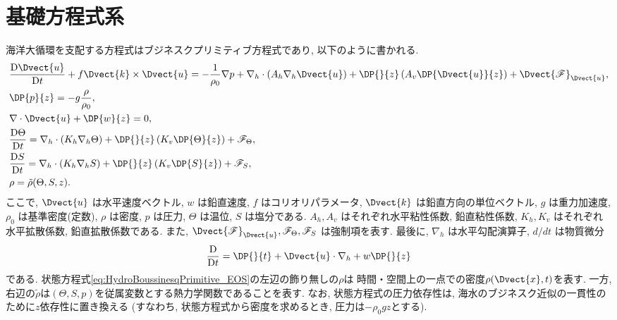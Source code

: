 \section{基礎方程式系}
海洋大循環を支配する方程式はブジネスクプリミティブ方程式であり,
以下のように書かれる.
\begin{subequations}
\begin{align}
 &   \DD{\Dvect{u}}{t}  +  f\Dvect{k} \times \Dvect{u}
 =
   -  \dfrac{1}{\rho_0} \nabla p
   + \nabla_h \cdot  (A_h \nabla_h \Dvect{u})
   + \DP{}{z} \left(A_v \DP{\Dvect{u}}{z}\right)
   + \Dvect{\mathscr{F}}_{\Dvect{u}},
 \label{eq:HydroBoussinesqPrimitive_MomUV}  
\\%
 &   \DP{p}{z}
 = - g \dfrac{\rho}{\rho_0},
 \label{eq:HydroBoussinesqPrimitive_MomW} 
\\%
 & \nabla \cdot \Dvect{u} + \DP{w}{z}                 
 = 0,
 \label{eq:HydroBoussinesqPrimitive_Continu} 
\\%
 &   \DD{\Theta}{t}
 =   \nabla_h \cdot (K_h \nabla_h \Theta)
   + \DP{}{z} \left(K_v\DP{\Theta}{z}\right)
   + {\mathscr{F}}_{\Theta},
 \label{eq:HydroBoussinesqPrimitive_PotTemp} 
\\%
 &   \DD{S}{t}
 =   \nabla_h \cdot (K_h \nabla_h S)
   + \DP{}{z} \left(K_v\DP{S}{z}\right)
   + {\mathscr{F}}_{S},
 \label{eq:HydroBoussinesqPrimitive_Salinity} 
\\%
 &   \rho = \tilde{\rho}(\Theta,S,z).
 \label{eq:HydroBoussinesqPrimitive_EOS}
\end{align}
\label{eq:HydroBoussinesqPrimitive}
\end{subequations}
ここで,
$\Dvect{u}$ は水平速度ベクトル,
$w$ は鉛直速度, 
$f$ はコリオリパラメータ,
$\Dvect{k}$ は鉛直方向の単位ベクトル,
$g$ は重力加速度,
$\rho_0$ は基準密度(定数),
$\rho$ は密度,
$p$ は圧力,
$\Theta$ は温位,
$S$ は塩分である.
$A_h, A_v$ はそれぞれ水平粘性係数, 鉛直粘性係数,
$K_h, K_v$ はそれぞれ水平拡散係数, 鉛直拡散係数である.
また, $\Dvect{\mathscr{F}}_{\Dvect{u}}, \mathscr{F}_\Theta, \mathscr{F}_S$ は強制項を表す. 
最後に,
$\nabla_h$ は水平勾配演算子, 
$d/dt$ は物質微分
\begin{align}
   \DD{}{t}
 = \DP{}{t} + \Dvect{u}\cdot\nabla_h + w\DP{}{z}
\end{align}
である.
状態方程式\eqref{eq:HydroBoussinesqPrimitive_EOS}の左辺の飾り無しの$\rho$は
時間・空間上の一点での密度$\rho(\Dvect{x},t)$を表す.
一方, 右辺の$\tilde{\rho}$は$(\Theta,S,p)$を従属変数とする熱力学関数であることを表す.
なお, 状態方程式の圧力依存性は, 海水のブジネスク近似の一貫性のために$z$依存性に置き換える
(すなわち, 状態方程式から密度を求めるとき, 圧力は$-\rho_0 gz$とする). 


